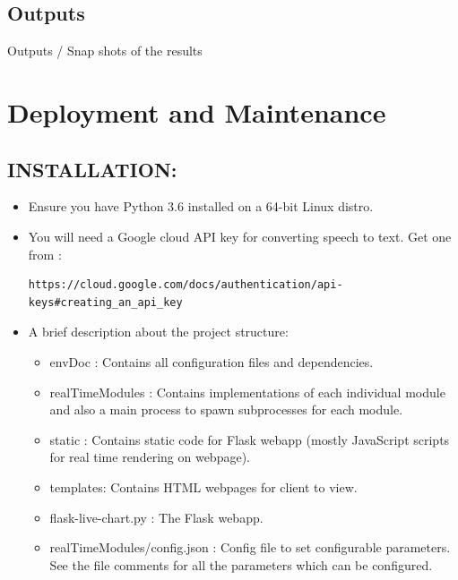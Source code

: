 \documentclass[oneside,a4paper,12pt]{report}
\begin{document}
\begin{normalsize}
\section{Outputs}

    Outputs / Snap shots of the results
\chapter{Deployment and Maintenance}
    \section{INSTALLATION:}
    \begin{itemize}
    
    
    \item Ensure you have Python 3.6 installed on a 64-bit Linux distro.
    
    \item You will need a Google cloud API key for converting speech to 
    text. Get one from : \begin{verbatim}https://cloud.google.com/docs/authentication/api-keys#creating_an_api_key \end{verbatim}
    
     \item A brief description about the project structure:
     \begin{itemize}
     	 \item envDoc : Contains all configuration files and dependencies.
     	 \item realTimeModules : Contains implementations of each individual module and also a main process to spawn subprocesses for each module.
     	 \item static : Contains static code for Flask webapp (mostly JavaScript scripts for real time rendering on webpage). 
     	 \item templates: Contains HTML webpages for client to view.
     	 \item flask-live-chart.py : The Flask webapp.
     	 
     	 \item realTimeModules/config.json : Config file to set configurable parameters. See the file comments for all the parameters which can be configured.
     \end{itemize}
   

\end{itemize}
\end{normalsize}
\end{document}
